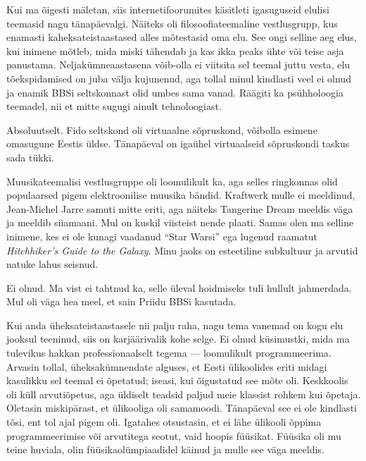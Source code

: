 
\label{sisu!inimeseks}Kui ma õigesti mäletan, siis internetifoorumites 
käsitleti igasuguseid elulisi teemasid nagu tänapäevalgi. 
Näiteks oli filosoofiateemaline vestlusgrupp, kus enamasti 
kaheksateistaastased alles mõtestasid oma elu. See ongi selline aeg 
elus, kui inimene mõtleb, mida miski tähendab ja kas ikka 
peaks ühte või teise asja panustama. Neljakümneaastasena 
võib-olla ei viitsita sel teemal juttu vesta, elu 
tõekspidamised on juba välja kujunenud, aga tollal minul kindlasti veel ei 
olnud ja enamik 
BBSi seltskonnast olid umbes sama vanad. Räägiti ka psühholoogia teemadel, nii 
et mitte sugugi ainult tehnoloogiast. 


Absoluutselt. Fido seltskond oli virtuaalne sõpruskond, võibolla esimene 
omasugune 
Eestis üldse. Tänapäeval on igaühel virtuaalseid sõpruskondi taskus sada tükki.


Muusikateemalisi vestlusgruppe oli loomulikult ka, aga selles ringkonnas olid 
populaarsed pigem elektroonilise muusika bändid.  
Kraftwerk mulle ei meeldinud, Jean-Michel Jarre samuti 
mitte eriti, aga näiteks Tangerine Dream meeldis väga ja meeldib
siiamaani. Mul on kuskil viisteist nende plaati. 
Samas olen ma selline inimene, kes ei ole kunagi vaadanud \enquote{Star Warsi} ega 
lugenud raamatut \emph{Hitchhiker's Guide to the Galaxy}. Minu jaoks on 
esteetiline subkultuur ja arvutid natuke lahus seisnud.


Ei olnud. Ma vist ei tahtnud ka, selle üleval hoidmiseks tuli hullult 
jahmerdada. 
Mul oli väga hea meel, et sain Priidu BBSi kasutada.


Kui anda üheksateistaastasele nii palju raha, nagu tema vanemad 
on kogu elu jooksul teeninud, siis on karjäärivalik kohe selge. Ei olnud 
küsimustki, mida ma 
tulevikus hakkan professionaalselt tegema --- loomulikult programmeerima. Arvasin 
tollal, 
üheksakümnendate alguses, et Eesti ülikoolides eriti midagi 
kasulikku sel teemal ei õpetatud; iseasi, kui õigustatud see mõte oli. 
Keskkoolis oli küll arvutiõpetus, aga üldiselt 
teadsid paljud meie klassist rohkem kui õpetaja. Oletasin
miskipärast, et ülikooliga oli samamoodi. Tänapäeval see ei ole kindlasti tõsi, 
ent tol ajal pigem oli. 
Igatahes otsustasin, et ei lähe ülikooli õppima 
programmeerimise või arvutitega seotut, vaid hoopis füüsikat. 
Füüsika oli mu teine huviala, olin 
füüsikaolümpiaadidel käinud ja mulle see väga meeldis. 

